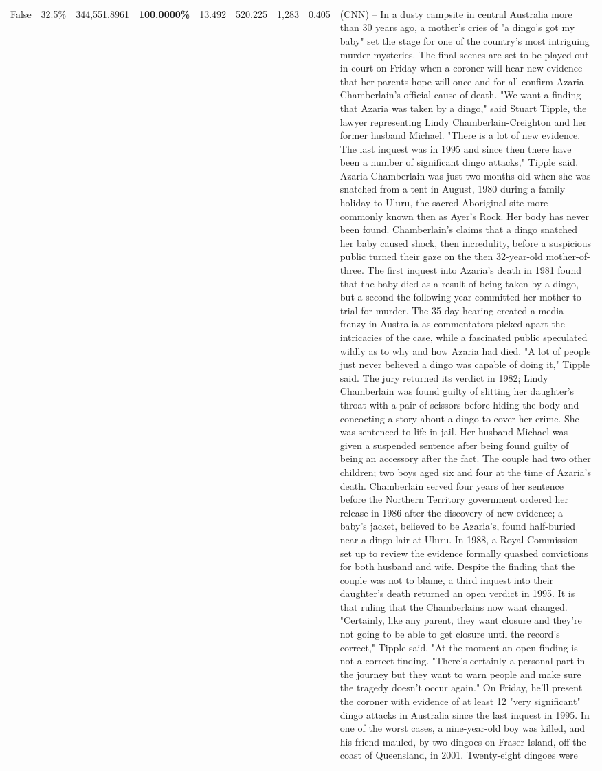 \begin{table}[H]
\begin{tabular}{lllrlllll}
False & 32.5\% & 344,551.8961 & \bfseries \color{red} 100.0000\% & 13.492 & 520.225 & 1,283 & 0.405 & (CNN) -- In a dusty campsite in central Australia more than 30 years ago, a mother's cries of "a dingo's got my baby" set the stage for one of the country's most intriguing murder mysteries. The final scenes are set to be played out in court on Friday when a coroner will hear new evidence that her parents hope will once and for all confirm Azaria Chamberlain's official cause of death. "We want a finding that Azaria was taken by a dingo," said Stuart Tipple, the lawyer representing Lindy Chamberlain-Creighton and her former husband Michael. "There is a lot of new evidence. The last inquest was in 1995 and since then there have been a number of significant dingo attacks," Tipple said. Azaria Chamberlain was just two months old when she was snatched from a tent in August, 1980 during a family holiday to Uluru, the sacred Aboriginal site more commonly known then as Ayer's Rock. Her body has never been found. Chamberlain's claims that a dingo snatched her baby caused shock, then incredulity, before a suspicious public turned their gaze on the then 32-year-old mother-of-three. The first inquest into Azaria's death in 1981 found that the baby died as a result of being taken by a dingo, but a second the following year committed her mother to trial for murder. The 35-day hearing created a media frenzy in Australia as commentators picked apart the intricacies of the case, while a fascinated public speculated wildly as to why and how Azaria had died. "A lot of people just never believed a dingo was capable of doing it," Tipple said. The jury returned its verdict in 1982; Lindy Chamberlain was found guilty of slitting her daughter's throat with a pair of scissors before hiding the body and concocting a story about a dingo to cover her crime. She was sentenced to life in jail. Her husband Michael was given a suspended sentence after being found guilty of being an accessory after the fact. The couple had two other children; two boys aged six and four at the time of Azaria's death. Chamberlain served four years of her sentence before the Northern Territory government ordered her release in 1986 after the discovery of new evidence; a baby's jacket, believed to be Azaria's, found half-buried near a dingo lair at Uluru. In 1988, a Royal Commission set up to review the evidence formally quashed convictions for both husband and wife. Despite the finding that the couple was not to blame, a third inquest into their daughter's death returned an open verdict in 1995. It is that ruling that the Chamberlains now want changed. "Certainly, like any parent, they want closure and they're not going to be able to get closure until the record's correct," Tipple said. "At the moment an open finding is not a correct finding. "There's certainly a personal part in the journey but they want to warn people and make sure the tragedy doesn't occur again." On Friday, he'll present the coroner with evidence of at least 12 "very significant" dingo attacks in Australia since the last inquest in 1995. In one of the worst cases, a nine-year-old boy was killed, and his friend mauled, by two dingoes on Fraser Island, off the coast of Queensland, in 2001. Twenty-eight dingoes were 
\end{tabular}
\end{table}

